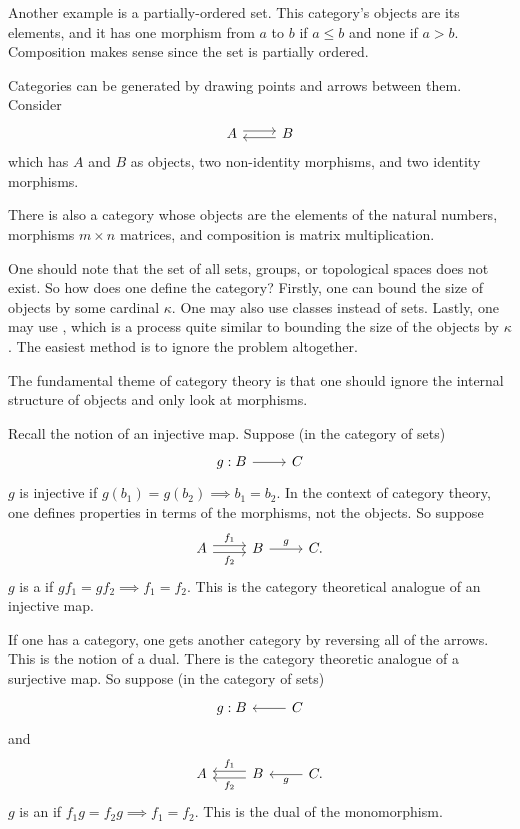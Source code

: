 \documentclass[11pt, oneside]{article}
\begin{document}
Another example is a partially-ordered set. \iffalse satisfying $a\leq a$ and 
$$
(a\leqslant b \land b\leqslant c) \implies a\leqslant c.
$$\fi
This category's objects are its elements, and it has one morphism from $a$ to $b$ if $a\leq b$ and none if $a>b$. Composition makes sense since the set is partially ordered.

Categories can be generated by drawing points and arrows between them. Consider 
\[
\begin{tikzcd}
A \arrow[r, shift left, ]& B\arrow[l, shift left, ]
\end{tikzcd}
\]
which has $A$ and $B$ as objects, two non-identity morphisms, and two identity morphisms.

There is also a category whose objects are the elements of the natural numbers, morphisms $m\times n$ matrices, and composition is matrix multiplication.

One should note that the set of all sets, groups, or topological spaces does not exist. So how does one define the category? Firstly, one can bound the size of objects by some cardinal $\kappa$. One may also use classes instead of sets. Lastly, one may use \href{https://en.wikipedia.org/wiki/Grothendieck_universe}{}, which is a process quite similar to bounding the size of the objects by $\kappa$. The easiest method is to ignore the problem altogether.

The fundamental theme of category theory is that one should ignore the internal structure of objects and only look at morphisms.

Recall the notion of an injective map. Suppose (in the category of sets)
\[
\begin{tikzcd}
g:B \ar[r]& C
\end{tikzcd}
\]
$g$ is injective if $g(b_1) = g(b_2) \implies b_1=b_2$. In the context of category theory, one defines properties in terms of the morphisms, not the objects. So suppose 
\[
\begin{tikzcd}
A \arrow[r, shift right, swap, "f_2"] \arrow[r, shift left, "f_1"]& B \arrow[r, "g"] & C.
\end{tikzcd}
\]
$g$ is a \href{https://en.wikipedia.org/wiki/Monomorphism}{} if $gf_1 = gf_2 \implies f_1=f_2$. This is the category theoretical analogue of an injective map.

If one has a category, one gets another category by reversing all of the arrows. This is the notion of a dual. There is the category theoretic analogue of a surjective map. So suppose (in the category of sets)
\[
\begin{tikzcd}
g:B &\ar[l] C
\end{tikzcd}
\]
and
\[
\begin{tikzcd}
A & B\arrow[l, shift right, swap, "f_1"] \arrow[l, shift left, "f_2"] & C \arrow[l, "g"].
\end{tikzcd}
\]
$g$ is an \href{https://en.wikipedia.org/wiki/Epimorphism}{} if $f_1g = f_2g \implies f_1=f_2$. This is the dual of the monomorphism.
\end{document}

